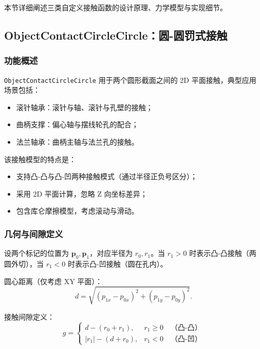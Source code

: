 \documentclass[12pt]{ctexart}
\begin{document}
本节详细阐述三类自定义接触函数的设计原理、力学模型与实现细节。

\subsection{ObjectContactCircleCircle：圆-圆罚式接触}

\subsubsection{功能概述}

\texttt{ObjectContactCircleCircle} 用于两个圆形截面之间的 2D 平面接触，典型应用场景包括：
\begin{itemize}
  \item 滚针轴承：滚针与轴、滚针与孔壁的接触；
  \item 曲柄支撑：偏心轴与摆线轮孔的配合；
  \item 法兰轴承：曲柄主轴与法兰孔的接触。
\end{itemize}

该接触模型的特点是：
\begin{itemize}
  \item 支持凸-凸与凸-凹两种接触模式（通过半径正负号区分）；
  \item 采用 2D 平面计算，忽略 Z 向坐标差异；
  \item 包含库仑摩擦模型，考虑滚动与滑动。
\end{itemize}

\subsubsection{几何与间隙定义}

设两个标记的位置为 $\mathbf{p}_0, \mathbf{p}_1$，对应半径为 $r_0, r_1$。当 $r_1 > 0$ 时表示凸-凸接触（两圆外切），当 $r_1 < 0$ 时表示凸-凹接触（圆在孔内）。

圆心距离（仅考虑 XY 平面）：
\begin{equation}
d = \sqrt{(p_{1x} - p_{0x})^2 + (p_{1y} - p_{0y})^2}.
\end{equation}

接触间隙定义：
\begin{equation}
g = \begin{cases}
d - (r_0 + r_1), & r_1 \geq 0 \quad \text{（凸-凸）} \\ |r_1| - (d + r_0), & r_1 < 0 \quad \text{（凸-凹）}
\end{cases}
\end{equation}
\end{document}
